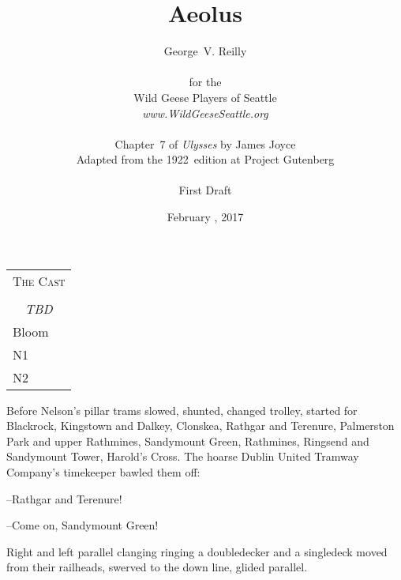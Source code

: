 


\title{\Huge Aeolus}
\author{George~V. Reilly\\
\\
{\small for the}\\
Wild Geese Players of Seattle\\
{\emph{www.WildGeeseSeattle.org}}\\
\\
{\small Chapter~7 of \emph{Ulysses} by James Joyce}\\
{\small Adapted from the 1922~edition at Project Gutenberg}
\\
\\
{\small First Draft}}
\date{February , 2017}
\raggedbottom



\maketitle
\thispagestyle{empty}
\pagebreak

\begin{tabular}{lp{10cm}}
    \multicolumn{2}{c}{\Large \textsc{The Cast}} \\
\\
    \multicolumn{2}{c}{\large \textit{TBD}} \\
Bloom \\
N1 \\
N2 \\
\end{tabular}

\thispagestyle{empty}
\newpage


\setcounter{page}{1}


Before Nelson's pillar trams slowed, shunted, changed trolley, started
for Blackrock, Kingstown and Dalkey, Clonskea, Rathgar and Terenure,
Palmerston Park and upper Rathmines, Sandymount Green, Rathmines,
Ringsend and Sandymount Tower, Harold's Cross. The hoarse Dublin
United Tramway Company's timekeeper bawled them off:

--Rathgar and Terenure!

--Come on, Sandymount Green!

Right and left parallel clanging ringing a doubledecker and a
singledeck moved from their railheads, swerved to the down line, glided
parallel.

